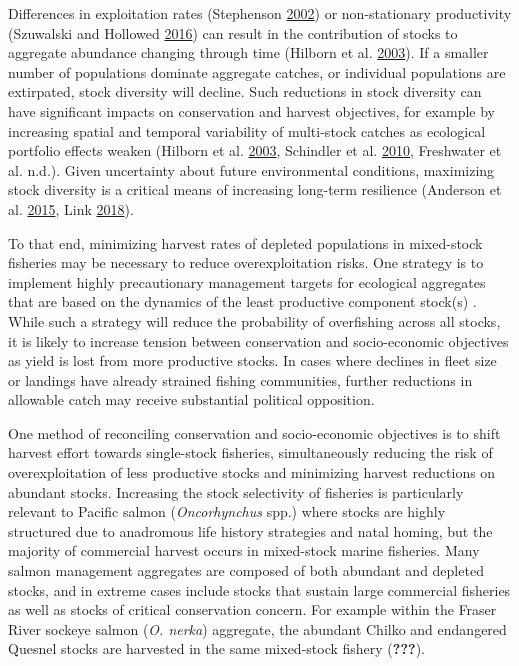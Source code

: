 \documentclass[11pt]{book}
\begin{document}
Differences in exploitation rates (Stephenson \protect\hyperlink{ref-Stephenson2002a}{2002}) or non-stationary productivity (Szuwalski and Hollowed \protect\hyperlink{ref-Szuwalski2016}{2016}) can result in the contribution of stocks to aggregate abundance changing through time (Hilborn et al. \protect\hyperlink{ref-Hilborn2003}{2003}). If a smaller number of populations dominate aggregate catches, or individual populations are extirpated, stock diversity will decline. Such reductions in stock diversity can have significant impacts on conservation and harvest objectives, for example by increasing spatial and temporal variability of multi-stock catches as ecological portfolio effects weaken (Hilborn et al. \protect\hyperlink{ref-Hilborn2003}{2003}, Schindler et al. \protect\hyperlink{ref-Schindler2010}{2010}, Freshwater et al. n.d.). Given uncertainty about future environmental conditions, maximizing stock diversity is a critical means of increasing long-term resilience (Anderson et al. \protect\hyperlink{ref-Anderson2015}{2015}, Link \protect\hyperlink{ref-Link2018}{2018}).

To that end, minimizing harvest rates of depleted populations in mixed-stock fisheries may be necessary to reduce overexploitation risks. One strategy is to implement highly precautionary management targets for ecological aggregates that are based on the dynamics of the least productive component stock(s) . While such a strategy will reduce the probability of overfishing across all stocks, it is likely to increase tension between conservation and socio-economic objectives as yield is lost from more productive stocks. In cases where declines in fleet size or landings have already strained fishing communities, further reductions in allowable catch may receive substantial political opposition.

One method of reconciling conservation and socio-economic objectives is to shift harvest effort towards single-stock fisheries, simultaneously reducing the risk of overexploitation of less productive stocks and minimizing harvest reductions on abundant stocks. Increasing the stock selectivity of fisheries is particularly relevant to Pacific salmon (\emph{Oncorhynchus} spp.) where stocks are highly structured due to anadromous life history strategies and natal homing, but the majority of commercial harvest occurs in mixed-stock marine fisheries. Many salmon management aggregates are composed of both abundant and depleted stocks, and in extreme cases include stocks that sustain large commercial fisheries as well as stocks of critical conservation concern. For example within the Fraser River sockeye salmon (\emph{O. nerka}) aggregate, the abundant Chilko and endangered Quesnel stocks are harvested in the same mixed-stock fishery ({\textbf{???}}).
\end{document}
